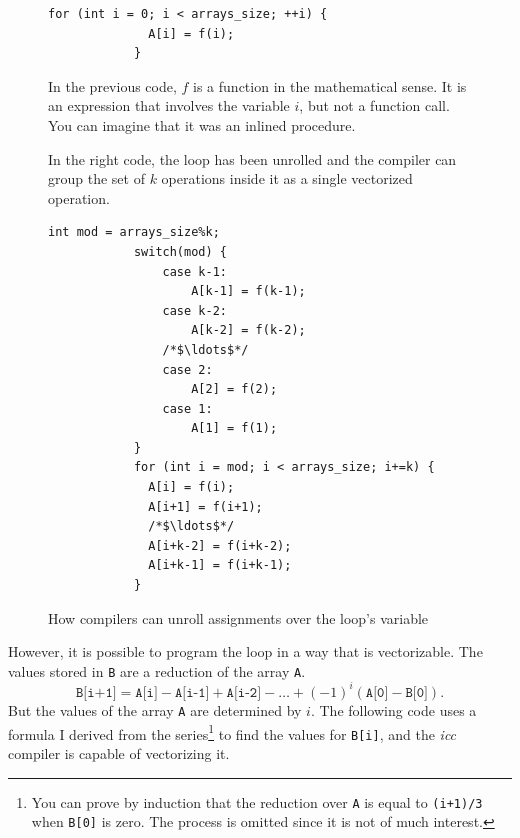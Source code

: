 \documentclass[
    12pt, %
]{fphw}
\newcommand{\tech}{\texttt}
\newcommand{\icc}{\textit{icc}}
\begin{document}
\begin{figure}[h]

    \caption{How compilers can unroll assignments over the loop's variable}
    \label{fig:loop-variable-unroll}

    \begin{minipage}[t][8cm][t]{.45\textwidth}

        \begin{lstlisting}[gobble=12,title=Original code]
            for (int i = 0; i < arrays_size; ++i) {
              A[i] = f(i);
            }

        \end{lstlisting}

        \vfill

        In the previous code, $f$ is a function in the mathematical sense.
        It is an expression that involves the variable $i$, but not a function call.
        You can imagine that it was an inlined procedure.

        \vfill

        In the right code, the loop has been unrolled and the compiler can
        group the set of $k$ operations inside it as a single vectorized operation.

    \end{minipage}
    \hfill
    \begin{minipage}[t][8cm][t]{.45\textwidth}

        \begin{lstlisting}[gobble=12,title=Unrolled code]
            int mod = arrays_size%k;
            switch(mod) {
                case k-1:
                    A[k-1] = f(k-1);
                case k-2:
                    A[k-2] = f(k-2);
                /*$\ldots$*/
                case 2:
                    A[2] = f(2);
                case 1:
                    A[1] = f(1);
            }
            for (int i = mod; i < arrays_size; i+=k) {
              A[i] = f(i);
              A[i+1] = f(i+1);
              /*$\ldots$*/
              A[i+k-2] = f(i+k-2);
              A[i+k-1] = f(i+k-1);
            }

        \end{lstlisting}

    \end{minipage}

\end{figure}

    However, it is possible to program the loop in a way that is vectorizable.
The values stored in \tech{B} are a reduction of the array \tech{A}.
%
\begin{equation*}
    \tech{B[i+1]} = \tech{A[i]}-\tech{A[i-1]}+\tech{A[i-2]}-
        \ldots+(-1)^i(\tech{A[0]}-\tech{B[0]}).
\end{equation*}
But the values of the array \tech{A} are determined by $i$.
The following code uses a formula I derived from the series\footnote{
    You can prove by induction that the reduction over \tech{A} is equal to \tech{(i+1)/3}
    when \tech{B[0]} is zero.
    The process is omitted since it is not of much interest.
} to find the values for \tech{B[i]},
and the \icc{} compiler is capable of vectorizing it.
\end{document}

